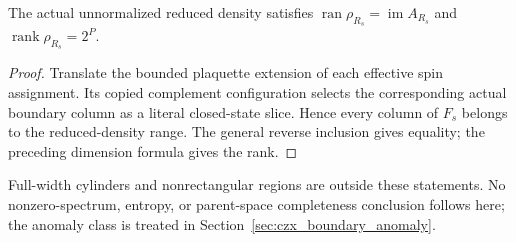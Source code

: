 \begin{lemma}%
    \label{thm:czx_wrapping_density}
    \leanok
    The actual unnormalized reduced density satisfies
    $\operatorname{ran}\rho_{R_s}=\operatorname{im}A_{R_s}$ and
    $\operatorname{rank}\rho_{R_s}=2^P$.
\end{lemma}
\begin{proof}\leanok
    Translate the bounded plaquette extension of each effective spin
    assignment. Its copied complement configuration selects the corresponding
    actual boundary column as a literal closed-state slice. Hence every
    column of $F_s$ belongs to the reduced-density range. The general
    reverse inclusion gives equality; the preceding dimension formula gives
    the rank.
\end{proof}

Full-width cylinders and nonrectangular regions are outside these statements.
No nonzero-spectrum, entropy, or parent-space completeness conclusion follows
here; the anomaly class is treated in Section~\ref{sec:czx_boundary_anomaly}.
